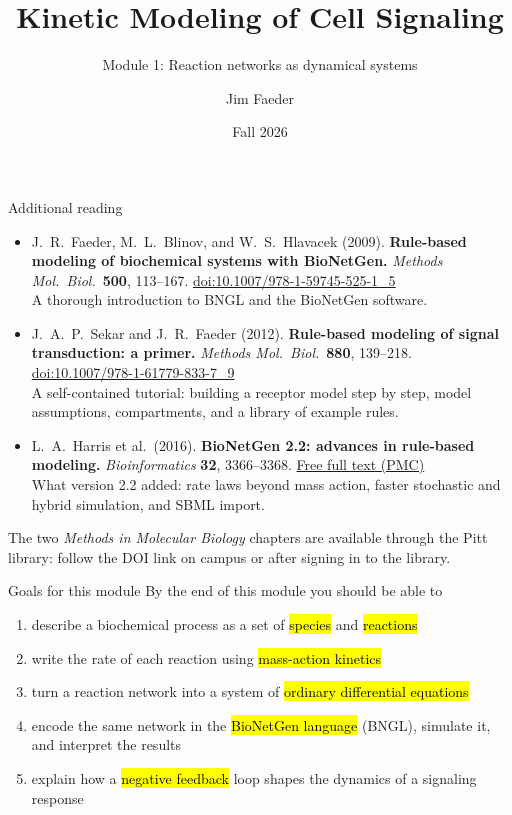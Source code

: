 \documentclass[aspectratio=169,10pt,t]{beamer}
\title{Kinetic Modeling of Cell Signaling}
\subtitle{Module 1: Reaction networks as dynamical systems}
\author{Jim Faeder}
\institute{MSCBIO 2025 \textperiodcentered{} Introduction to Bioinformatics Programming in Python}
\date{Fall 2026}
\begin{document}
\begin{frame}[plain]
  \titlepage
\end{frame}



\begin{frame}{Additional reading}
  \begin{itemize}
    \setlength\itemsep{2mm}
    \item J.~R.~Faeder, M.~L.~Blinov, and W.~S.~Hlavacek (2009).
          \textbf{Rule-based modeling of biochemical systems with BioNetGen.}
          \emph{Methods Mol.\ Biol.}\ \textbf{500}, 113--167.
          \href{https://doi.org/10.1007/978-1-59745-525-1_5}{doi:10.1007/978-1-59745-525-1\_5}\\
          {\small\color{fsGray} A thorough introduction to BNGL and the BioNetGen software.}
    \item J.~A.~P.~Sekar and J.~R.~Faeder (2012).
          \textbf{Rule-based modeling of signal transduction: a primer.}
          \emph{Methods Mol.\ Biol.}\ \textbf{880}, 139--218.
          \href{https://doi.org/10.1007/978-1-61779-833-7_9}{doi:10.1007/978-1-61779-833-7\_9}\\
          {\small\color{fsGray} A self-contained tutorial: building a receptor model step by
          step, model assumptions, compartments, and a library of example rules.}
    \item L.~A.~Harris et al.\ (2016).
          \textbf{BioNetGen 2.2: advances in rule-based modeling.}
          \emph{Bioinformatics} \textbf{32}, 3366--3368.
          \href{https://pmc.ncbi.nlm.nih.gov/articles/PMC5079481/}{Free full text (PMC)}\\
          {\small\color{fsGray} What version 2.2 added: rate laws beyond mass action, faster
          stochastic and hybrid simulation, and SBML import.}
  \end{itemize}
  \vskip1mm
  {\small The two \emph{Methods in Molecular Biology} chapters are available through the
  Pitt library: follow the DOI link on campus or after signing in to the library.}
\end{frame}

\begin{frame}{Goals for this module}
  By the end of this module you should be able to
  \begin{enumerate}[<+->]
    \setlength\itemsep{1.5mm}
    \item describe a biochemical process as a set of \hl{species} and \hl{reactions}
    \item write the rate of each reaction using \hl{mass-action kinetics}
    \item turn a reaction network into a system of \hl{ordinary differential equations}
    \item encode the same network in the \hl{BioNetGen language} (BNGL), simulate it,
          and interpret the results
    \item explain how a \hl{negative feedback} loop shapes the dynamics of a signaling response
  \end{enumerate}
\end{frame}
\end{document}
